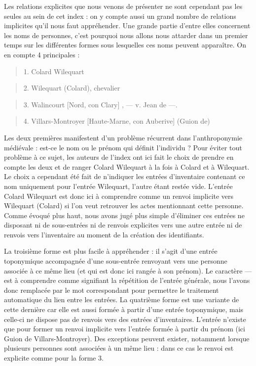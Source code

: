 \documentclass[a4paper,12pt,twoside]{book}
\begin{document}
	Les relations explicites que nous venons de présenter ne sont cependant pas les seules au sein de cet index : on y compte aussi un grand nombre de relations implicites qu'il nous faut appréhender. Une grande partie d'entre elles concernent les noms de personnes, c'est pourquoi nous allons nous attarder dans un premier temps sur les différentes formes sous lesquelles ces noms peuvent apparaître. On en compte 4 principales :
	
	\begin{quotation}
		1. Colard Wilequart
	\end{quotation}

	\begin{quotation}
		2. Wilequart (Colard), chevalier
	\end{quotation}

	\begin{quotation}
		3. Walincourt [Nord, con Clary] , — v. Jean de —.
	\end{quotation}

	\begin{quotation}
		4. Villars-Montroyer [Haute-Marne, con Auberive] (Guion	de)
	\end{quotation}
	
	\noindent Les deux premières manifestent d'un problème récurrent dans l'anthroponymie médiévale : est-ce le nom ou le prénom qui définit l'individu ? Pour éviter tout problème à ce sujet, les auteurs de l'index ont ici fait le choix de prendre en compte les deux et de ranger \og Colard Wilequart\fg{} à la fois à \og Colard\fg{} et à \og Wilequart\fg{}. Le choix a cependant été fait de n'indiquer les entrées d'inventaire contenant ce nom uniquement pour l'entrée \og Wilequart\fg{}, l'autre étant restée vide. L'entrée \og Colard Wilequart\fg{} est donc ici à comprendre comme un renvoi implicite vers \og Wilequart (Colard)\fg{} si l'on veut retrouver les actes mentionnant cette personne. Comme évoqué plus haut, nous avons jugé plus simple d'éliminer ces entrées ne disposant ni de sous-entrées ni de renvois explicites vers une autre entrée ni de renvois vers l'inventaire au moment de la création des identifiants.
	
	La troisième forme est plus facile à appréhender : il s'agit d'une entrée toponymique accompagnée d'une sous-entrée renvoyant vers une personne associée à ce même lieu (et qui est donc ici rangée à son prénom). Le caractère \og —\fg{} est à comprendre comme signifiant la répétition de l'entrée générale, nous l'avons donc remplacée par le mot correspondant pour permettre le traitement automatique du lien entre les entrées. La quatrième forme est une variante de cette dernière car elle est aussi formée à partir d'une entrée toponymique, mais celle-ci ne dispose pas de renvois vers des entrées d'inventaires. L'entrée n'existe que pour former un renvoi implicite vers l'entrée formée à partir du prénom (ici \og Guion de Villars-Montroyer\fg{}). Des exceptions peuvent exister, notamment lorsque plusieurs personnes sont associées à un même lieu : dans ce cas le renvoi est explicite comme pour la forme 3.
	
\end{document}
